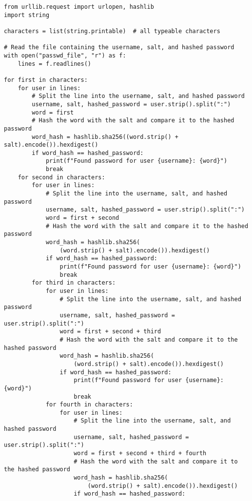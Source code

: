 \documentclass{article}
\begin{document}
\begin{lstlisting}[basicstyle=\tiny]
from urllib.request import urlopen, hashlib
import string

characters = list(string.printable)  # all typeable characters

# Read the file containing the username, salt, and hashed password
with open("passwd_file", "r") as f:
    lines = f.readlines()

for first in characters:
    for user in lines:
        # Split the line into the username, salt, and hashed password
        username, salt, hashed_password = user.strip().split(":")
        word = first
        # Hash the word with the salt and compare it to the hashed password
        word_hash = hashlib.sha256((word.strip() + salt).encode()).hexdigest()
        if word_hash == hashed_password:
            print(f"Found password for user {username}: {word}")
            break
    for second in characters:
        for user in lines:
            # Split the line into the username, salt, and hashed password
            username, salt, hashed_password = user.strip().split(":")
            word = first + second
            # Hash the word with the salt and compare it to the hashed password
            word_hash = hashlib.sha256(
                (word.strip() + salt).encode()).hexdigest()
            if word_hash == hashed_password:
                print(f"Found password for user {username}: {word}")
                break
        for third in characters:
            for user in lines:
                # Split the line into the username, salt, and hashed password
                username, salt, hashed_password = user.strip().split(":")
                word = first + second + third
                # Hash the word with the salt and compare it to the hashed password
                word_hash = hashlib.sha256(
                    (word.strip() + salt).encode()).hexdigest()
                if word_hash == hashed_password:
                    print(f"Found password for user {username}: {word}")
                    break
            for fourth in characters:
                for user in lines:
                    # Split the line into the username, salt, and hashed password
                    username, salt, hashed_password = user.strip().split(":")
                    word = first + second + third + fourth
                    # Hash the word with the salt and compare it to the hashed password
                    word_hash = hashlib.sha256(
                        (word.strip() + salt).encode()).hexdigest()
                    if word_hash == hashed_password:

\end{lstlisting}
\end{document}
